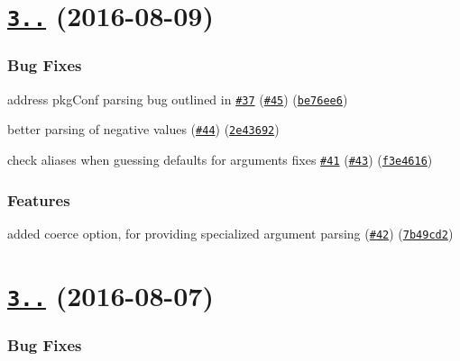 \label{_3.1.0}%
 \section*{\href{https://github.com/yargs/yargs-parser/compare/v3.0.0...v3.1.0}{\tt 3..} (2016-\/08-\/09)}

\subsubsection*{Bug Fixes}


\begin{DoxyItemize}
\item address pkg\+Conf parsing bug outlined in \href{https://github.com/yargs/yargs-parser/issues/37}{\tt \#37} (\href{https://github.com/yargs/yargs-parser/issues/45}{\tt \#45}) (\href{https://github.com/yargs/yargs-parser/commit/be76ee6}{\tt be76ee6})
\item better parsing of negative values (\href{https://github.com/yargs/yargs-parser/issues/44}{\tt \#44}) (\href{https://github.com/yargs/yargs-parser/commit/2e43692}{\tt 2e43692})
\item check aliases when guessing defaults for arguments fixes \href{https://github.com/yargs/yargs-parser/issues/41}{\tt \#41} (\href{https://github.com/yargs/yargs-parser/issues/43}{\tt \#43}) (\href{https://github.com/yargs/yargs-parser/commit/f3e4616}{\tt f3e4616})
\end{DoxyItemize}

\subsubsection*{Features}


\begin{DoxyItemize}
\item added coerce option, for providing specialized argument parsing (\href{https://github.com/yargs/yargs-parser/issues/42}{\tt \#42}) (\href{https://github.com/yargs/yargs-parser/commit/7b49cd2}{\tt 7b49cd2})
\end{DoxyItemize}

\label{_3.0.0}%
 \section*{\href{https://github.com/yargs/yargs-parser/compare/v2.4.1...v3.0.0}{\tt 3..} (2016-\/08-\/07)}

\subsubsection*{Bug Fixes}


